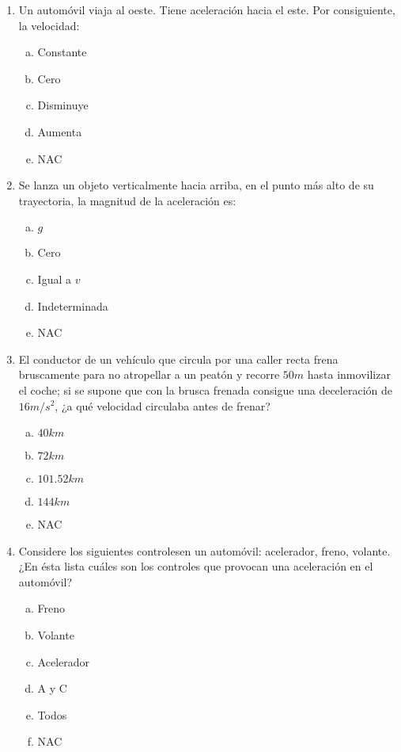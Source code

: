 \begin{multicols}{2}
\begin{enumerate}
	
	
	
	
	
	
	\item Un automóvil viaja al oeste. Tiene aceleración hacia el este. Por consiguiente, la velocidad:
	\begin{enumerate}[a)]
		\item Constante
		\item Cero
		\item \colorbox[rgb]{1,1,0}{Disminuye}
		\item Aumenta
		\item NAC
	\end{enumerate}
	
	
	
	\item Se lanza un objeto verticalmente hacia arriba, en el punto más alto de su trayectoria, la magnitud de la aceleración es:
	\begin{enumerate}[a)]
		\item \colorbox[rgb]{1,1,0}{$g$}
		\item Cero
		\item Igual a $v$
		\item Indeterminada
		\item NAC
	\end{enumerate}
	
	
	
	\item El conductor de un vehículo que circula por una caller recta frena bruscamente para no atropellar a un peatón y recorre $50m$ hasta inmovilizar el coche; si se supone que con la brusca frenada consigue una deceleración de $16m/s^2$, ¿a qué velocidad circulaba antes de frenar?
	\begin{enumerate}[a)]
		\item $40km$
		\item $72km$
		\item $101.52km$
		\item \colorbox[rgb]{1,1,0}{$144km$}
		\item NAC
	\end{enumerate}
	
	
	
	\item Considere los siguientes controlesen un automóvil: acelerador, freno, volante. ¿En ésta lista cuáles son los controles que provocan una aceleración en el automóvil?
	\begin{enumerate}[a)]
		\item Freno
		\item Volante
		\item Acelerador
		\item A y C
		\item \colorbox[rgb]{1,1,0}{Todos}
		\item NAC
	\end{enumerate}
	

\end{enumerate}
\end{multicols}
